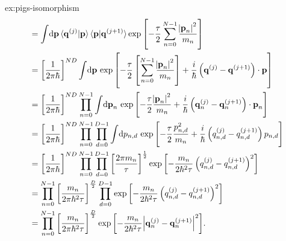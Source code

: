 \begin{DefAnswer}{ex:pigs-isomorphism}
\begin{subequations}
\begin{align}
		&= \int\! \dif \vec{p}
				\braket{\vec{q}\bead{j} | \vec{p}} \braket{\vec{p} | \vec{q}\bead{j+1}}
				\expb{-\frac{\tau}{2} \sum_{n=0}^{N-1} \frac{\abs{\vec{p}_n}^2}{m_n}} \\
		&= \left[ \frac{1}{2 \pi \hbar} \right]^{N D}
			\int\! \dif \vec{p} \, \expb{
					-\frac{\tau}{2} \left[ \sum_{n=0}^{N-1} \frac{\abs{\vec{p}_n}^2}{m_n} \right]
					+ \frac{i}{\hbar} \left( \vec{q}\bead{j} - \vec{q}\bead{j+1} \right) \cdot \vec{p}
				} \\
		&= \left[ \frac{1}{2 \pi \hbar} \right]^{N D}
			\prod_{n=0}^{N-1} \int\! \dif \vec{p}_n \, \expb{
					-\frac{\tau}{2} \frac{\abs{\vec{p}_n}^2}{m_n}
					+ \frac{i}{\hbar} \left( \vec{q}_n\bead{j} - \vec{q}_n\bead{j+1} \right) \cdot \vec{p}_n
				} \\
		&= \left[ \frac{1}{2 \pi \hbar} \right]^{N D}
			\prod_{n=0}^{N-1} \prod_{d=0}^{D-1} \int\! \dif p_{n,d} \, \expb{
					-\frac{\tau}{2} \frac{p_{n,d}^2}{m_n}
					+ \frac{i}{\hbar} \left( q_{n,d}\bead{j} - q_{n,d}\bead{j+1} \right) p_{n,d}
				} \\
		&= \left[ \frac{1}{2 \pi \hbar} \right]^{N D}
			\prod_{n=0}^{N-1} \prod_{d=0}^{D-1}
				\left[ \frac{2 \pi m_n}{\tau} \right]^\frac{1}{2}
				\expb{
					-\frac{m_n}{2 \hbar^2 \tau} \left( q_{n,d}\bead{j} - q_{n,d}\bead{j+1} \right)^2
				} \\
		&= \prod_{n=0}^{N-1}
				\left[ \frac{m_n}{2 \pi \hbar^2 \tau} \right]^\frac{D}{2}
				\prod_{d=0}^{D-1}
					\expb{
						-\frac{m_n}{2 \hbar^2 \tau} \left( q_{n,d}\bead{j} - q_{n,d}\bead{j+1} \right)^2
					} \\
		&= \prod_{n=0}^{N-1}
				\left[ \frac{m_n}{2 \pi \hbar^2 \tau} \right]^\frac{D}{2}
				\expb{
					-\frac{m_n}{2 \hbar^2 \tau} \abs{\vec{q}_n\bead{j} - \vec{q}_n\bead{j+1}}^2
				}.
	\end{align}
	\end{subequations}


\end{DefAnswer}
